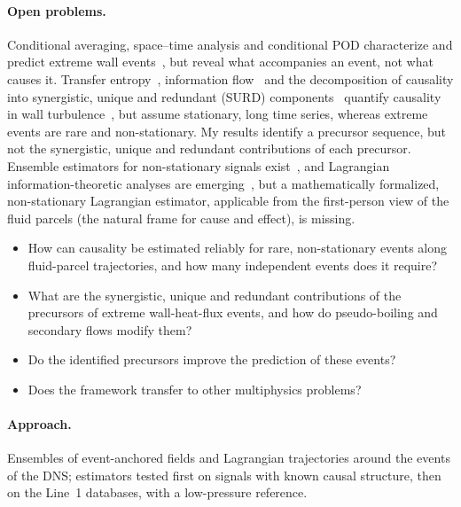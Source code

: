 \documentclass[11pt]{article}
\begin{document}
\paragraph{Open problems.} Conditional averaging, space--time analysis and conditional POD
characterize and predict extreme wall events~\cite{Guerrero2020,Hack2021,Zhang2023,Blonigan2019,Martin2025},
but reveal what accompanies an event, not what causes it. Transfer entropy~\cite{Schreiber2000},
information flow~\cite{Liang2005} and the decomposition of causality into synergistic, unique and
redundant (SURD) components~\cite{MartinezSanchez2024} quantify causality in wall
turbulence~\cite{LozanoDuran2020,Massaro2023,Zhang2026}, but assume stationary, long time
series, whereas extreme events are rare and non-stationary. My results identify a precursor sequence,
but not the synergistic, unique and redundant contributions of each precursor. Ensemble
estimators for non-stationary signals exist~\cite{Wollstadt2014}, and Lagrangian
information-theoretic analyses are emerging~\cite{Jiang2027}, but a mathematically formalized,
non-stationary Lagrangian estimator, applicable from the first-person view of the fluid parcels
(the natural frame for cause and effect), is missing.
\begin{itemize}
  \item[\textbf{Q2.1}] How can causality be estimated reliably for rare, non-stationary events
  along fluid-parcel trajectories, and how many independent events does it require?
  \item[\textbf{Q2.2}] What are the synergistic, unique and redundant contributions of the
  precursors of extreme wall-heat-flux events, and how do pseudo-boiling and secondary flows
  modify them?
  \item[\textbf{Q2.3}] Do the identified precursors improve the prediction of these events?
  \item[\textbf{Q2.4}] Does the framework transfer to other multiphysics problems?
\end{itemize}
\paragraph{Approach.} Ensembles of event-anchored fields and Lagrangian trajectories around the
events of the DNS; estimators tested first on signals with known causal structure, then on the
Line~1 databases, with a low-pressure reference.
\end{document}
